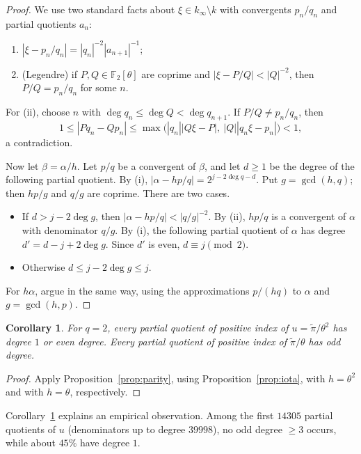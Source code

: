 \documentclass[11pt]{amsart}
\newtheorem{corollary}[theorem]{Corollary}
\theoremstyle{remark}
\numberwithin{equation}{section}
\newcommand{\F}{\mathbb{F}}
\newcommand{\kinf}{k_\infty}
\newcommand{\pit}{\tilde\pi}
\begin{document}
\begin{proof}
We use two standard facts about $\xi\in\kinf\setminus k$ with convergents $p_n/q_n$ and partial quotients $a_n$:
\begin{enumerate}
\item[(i)] $|\xi-p_n/q_n|=|q_n|^{-2}|a_{n+1}|^{-1}$;
\item[(ii)] (Legendre) if $P,Q\in\F_2[\theta]$ are coprime and $|\xi-P/Q|<|Q|^{-2}$, then $P/Q=p_n/q_n$ for some $n$.
\end{enumerate}
For (ii), choose $n$ with $\deg q_n\le\deg Q<\deg q_{n+1}$. If $P/Q\ne p_n/q_n$, then
\[
1\le|Pq_n-Qp_n|\le\max\bigl(|q_n||Q\xi-P|,\ |Q||q_n\xi-p_n|\bigr)<1,
\]
a contradiction.

Now let $\beta=\alpha/h$. Let $p/q$ be a convergent of $\beta$, and let $d\ge1$ be the degree of the following partial quotient. By (i), $|\alpha-hp/q|=2^{j-2\deg q-d}$. Put $g=\gcd(h,q)$; then $hp/g$ and $q/g$ are coprime. There are two cases.
\begin{itemize}
\item If $d>j-2\deg g$, then $|\alpha-hp/q|<|q/g|^{-2}$. By (ii), $hp/q$ is a convergent of $\alpha$ with denominator $q/g$. By (i), the following partial quotient of $\alpha$ has degree $d'=d-j+2\deg g$. Since $d'$ is even, $d\equiv j\pmod 2$.
\item Otherwise $d\le j-2\deg g\le j$.
\end{itemize}
For $h\alpha$, argue in the same way, using the approximations $p/(hq)$ to $\alpha$ and $g=\gcd(h,p)$.
\end{proof}

\begin{corollary}\label{cor:parity}
For $q=2$, every partial quotient of positive index of $u=\pit/\theta^2$ has degree $1$ or even degree. Every partial quotient of positive index of $\pit/\theta$ has odd degree.
\end{corollary}

\begin{proof}
Apply Proposition~\ref{prop:parity}, using Proposition~\ref{prop:iota}, with $h=\theta^2$ and with $h=\theta$, respectively.
\end{proof}

Corollary~\ref{cor:parity} explains an empirical observation. Among the first $14305$ partial quotients of $u$ (denominators up to degree $39998$), no odd degree $\ge3$ occurs, while about $45\%$ have degree $1$.
\end{document}
